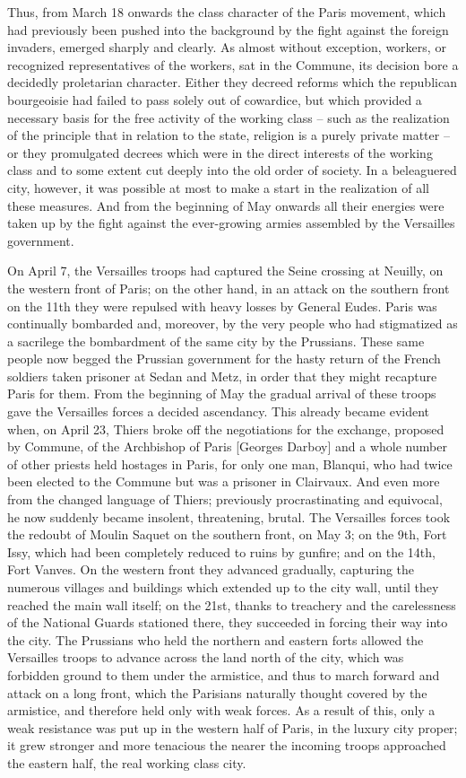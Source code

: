 \documentclass{article}
\begin{document}
Thus, from March 18 onwards the class character of the Paris movement,
which had previously been pushed into the background by the fight against
the foreign invaders, emerged sharply and clearly. As almost without
exception, workers, or recognized representatives of the workers, sat in
the Commune, its decision bore a decidedly proletarian character. Either
they decreed reforms which the republican bourgeoisie had failed to pass
solely out of cowardice, but which provided a necessary basis for the free
activity of the working class – such as the realization of the principle
that in relation to the state, religion is a purely private matter – or
they promulgated decrees which were in the direct interests of the working
class and to some extent cut deeply into the old order of society. In
a beleaguered city, however, it was possible at most to make a start in
the realization of all these measures. And from the beginning of May
onwards all their energies were taken up by the fight against the
ever-growing armies assembled by the Versailles government.

On April 7, the Versailles troops had captured the Seine crossing at
Neuilly, on the western front of Paris; on the other hand, in an attack on
the southern front on the 11th they were repulsed with heavy losses by
General Eudes. Paris was continually bombarded and, moreover, by the very
people who had stigmatized as a sacrilege the bombardment of the same city
by the Prussians. These same people now begged the Prussian government for
the hasty return of the French soldiers taken prisoner at Sedan and Metz,
in order that they might recapture Paris for them. From the beginning of
May the gradual arrival of these troops gave the Versailles forces
a decided ascendancy. This already became evident when, on April 23,
Thiers broke off the negotiations for the exchange, proposed by Commune,
of the Archbishop of Paris [Georges Darboy] and a whole number of other
priests held hostages in Paris, for only one man, Blanqui, who had twice
been elected to the Commune but was a prisoner in Clairvaux. And even more
from the changed language of Thiers; previously procrastinating and
equivocal, he now suddenly became insolent, threatening, brutal. The
Versailles forces took the redoubt of Moulin Saquet on the southern front,
on May 3; on the 9th, Fort Issy, which had been completely reduced to
ruins by gunfire; and on the 14th, Fort Vanves. On the western front they
advanced gradually, capturing the numerous villages and buildings which
extended up to the city wall, until they reached the main wall itself; on
the 21st, thanks to treachery and the carelessness of the National Guards
stationed there, they succeeded in forcing their way into the city. The
Prussians who held the northern and eastern forts allowed the Versailles
troops to advance across the land north of the city, which was forbidden
ground to them under the armistice, and thus to march forward and attack
on a long front, which the Parisians naturally thought covered by the
armistice, and therefore held only with weak forces. As a result of this,
only a weak resistance was put up in the western half of Paris, in the
luxury city proper; it grew stronger and more tenacious the nearer the
incoming troops approached the eastern half, the real working class city.
\end{document}
